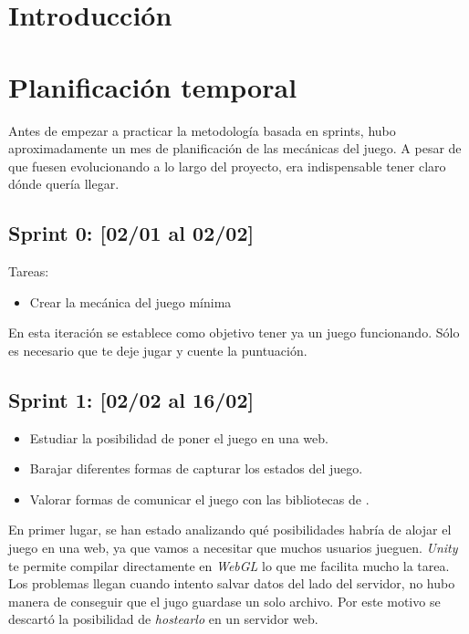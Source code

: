 
\section{Introducción}



\section{Planificación temporal}

Antes de empezar a practicar la metodología basada en sprints, hubo aproximadamente un mes de planificación de las mecánicas del juego. A pesar de que fuesen evolucionando a lo largo del proyecto, era indispensable tener claro dónde quería llegar.


\subsection{Sprint 0: [02/01 al 02/02] }
Tareas:
\begin{itemize}
    \item Crear la mecánica del juego mínima
\end{itemize}


En esta iteración se establece como objetivo tener ya un juego funcionando. Sólo es necesario que te deje jugar y cuente la puntuación.

\subsection{Sprint 1: [02/02 al 16/02]}

\begin{itemize}
     \item Estudiar la posibilidad de poner el juego en una web. 
     \item Barajar diferentes formas de capturar los estados del juego. \item Valorar formas de comunicar el juego con las bibliotecas de .
\end{itemize}

En primer lugar, se han estado analizando qué posibilidades habría de alojar el juego en una web, ya que vamos a necesitar que muchos usuarios jueguen. \emph{Unity} te permite compilar directamente en \emph{WebGL} lo que me facilita mucho la tarea. Los problemas llegan cuando intento salvar datos del lado del servidor, no hubo manera de conseguir que el jugo guardase un solo archivo. Por este motivo se descartó la posibilidad de \emph{hostearlo} en un servidor web.

